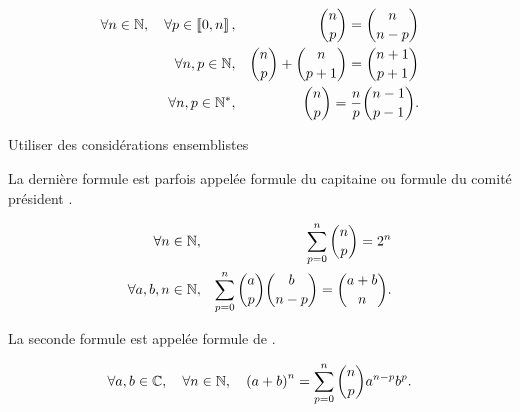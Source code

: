 \documentclass{magnolia}
\begin{document}
\begin{proposition}
\begin{eqnarray*}
\forall n\in\mathbb{N} ,\quad \forall p\in\left\llbracket 0,n\right\rrbracket, & &
  \binom{n}{p}=\binom{n}{n-p}\\
\forall n,p\in\mathbb{N}, & & \binom{n}{p}+\binom{n}{p+1}=\binom{n+1}{p+1}\\
\forall n,p\in{\mathbb{N}^*}, & & \binom{n}{p}=\frac{n}{p}\binom{n-1}{p-1}.
\end{eqnarray*}
\end{proposition}

\begin{preuve}
Utiliser des considérations ensemblistes
\end{preuve}

\begin{remarqueUnique}
\remarque La dernière formule est parfois appelée \og formule du capitaine \fg ou formule du
  \og comité président \fg.
\end{remarqueUnique}

\begin{proposition}
\begin{eqnarray*}
\forall n\in\mathbb{N}, & & \sum_{p=0}^n \binom{n}{p}=2^n\\
\forall a,b,n\in\mathbb{N}, & & \sum_{p=0}^n \binom{a}{p}\binom{b}{n-p}=\binom{a+b}{n}. 
\end{eqnarray*}
\end{proposition}

\begin{remarqueUnique}
\remarque La seconde formule est appelée formule de .
\end{remarqueUnique}

\begin{proposition}[nom={Binôme de \nom{Newton}}]
\[\forall a,b\in\mathbb{C},\quad \forall n\in\mathbb{N},\quad \left(a+b\right)^n =\sum_{p=0}^n \binom{n}{p} a^{n-p} b^p.\]
\end{proposition}


\end{document}
